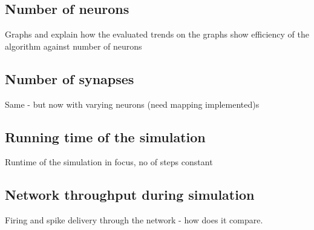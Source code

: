 \subsection{Number of neurons}

Graphs and explain how the evaluated trends on the graphs show efficiency of the algorithm against number of neurons

\subsection{Number of synapses}

Same - but now with varying neurons (need mapping implemented)s

\subsection{Running time of the simulation}

Runtime of the simulation in focus, no of steps constant

\subsection{Network throughput during simulation}

Firing and spike delivery through the network - how does it compare.
